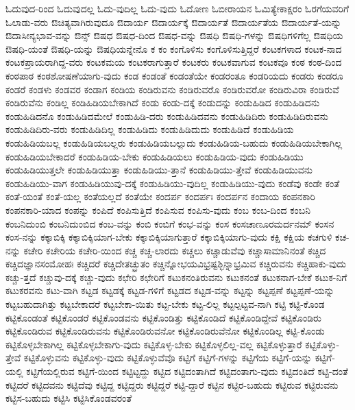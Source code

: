 {ಓದುವುದ-ರಿಂದ
ಓದುವುದಲ್ಲ
ಓದು-ವುದಿಲ್ಲ
ಓದು-ವುದು
ಓದೋಣ
ಓಬೀರಾಯನ
ಓಮಿತ್ಯೇಕಾಕ್ಷರಂ
ಓರಗೆಯವರಿಗೆ
ಓಲಾಡು-ವರು
ಔಚಿತ್ಯವಾಗಿರುವುದೂ
ಔದಾರ್ಯ
ಔದಾರ್ಯಕ್ಕೆ
ಔದಾರ್ಯತೆ
ಔದಾರ್ಯತೆಯ
ಔದಾರ್ಯತೆ-ಯನ್ನು
ಔದಾಸೀನ್ಯಭಾವ-ವನ್ನು
ಔನ್ಸ್
ಔಷಧ
ಔಷಧ-ದಿಂದ
ಔಷಧ-ವನ್ನು
ಔಷಧಿ
ಔಷಧಿ-ಗಳನ್ನು
ಔಷಧಿಗಳಿಗೆಲ್ಲ
ಔಷಧಿಯ
ಔಷಧಿ-ಯಂತೆ
ಔಷಧಿ-ಯನ್ನು
ಔಷಧಿಯನ್ನೇನೊ
ಕ
ಕಂ
ಕಂಗೊಳಿಸು
ಕಂಗೊಳಿಸುತ್ತಿದ್ದರೆ
ಕಂಟಕಗಳಾದ
ಕಂಟಕ-ನಾದ
ಕಂಟಕಪ್ರಾಯರಾಗಿದ್ದ-ವರು
ಕಂಟಕಮಯ
ಕಂಟಕರಾಗುತ್ತಾರೆ
ಕಂಟಕರು
ಕಂಟಕವಾಗುವ
ಕಂಟಕವೂ
ಕಂಠ
ಕಂಠ-ದಿಂದ
ಕಂಠಪಾಠ
ಕಂಠಶೋಷಣೆಯಾಗು-ವುದು
ಕಂಡ
ಕಂಡಂತೆ
ಕಂಡಂತೆಯೇ
ಕಂಡರಂತೂ
ಕಂಡರಿಯದು
ಕಂಡರು
ಕಂಡರೂ
ಕಂಡರೆ
ಕಂಡಳು
ಕಂಡವರ
ಕಂಡಾಗ
ಕಂಡಿಯ
ಕಂಡಿರುವನು
ಕಂಡಿರುವರೊ
ಕಂಡಿರುವರೋ
ಕಂಡಿರುವಿರಾ
ಕಂಡಿರುವೆ
ಕಂಡಿರುವೆನು
ಕಂಡಿಲ್ಲ
ಕಂಡಿಹಿಡಿಯಬೇಕಾಗಿದೆ
ಕಂಡು
ಕಂಡು-ದಕ್ಕೆ
ಕಂಡುದನ್ನು
ಕಂಡುಹಿಡಿದ
ಕಂಡುಹಿಡಿದನು
ಕಂಡುಹಿಡಿದನೊ
ಕಂಡುಹಿಡಿದಮೇಲೆ
ಕಂಡುಹಿಡಿ-ದರು
ಕಂಡುಹಿಡಿದವನು
ಕಂಡುಹಿಡಿದಿರು
ಕಂಡುಹಿಡಿದಿರುವನು
ಕಂಡುಹಿಡಿದಿರು-ವರು
ಕಂಡುಹಿಡಿದಿಲ್ಲ
ಕಂಡುಹಿಡಿದು
ಕಂಡುಹಿಡಿದುದು
ಕಂಡುಹಿಡಿದೆ
ಕಂಡುಹಿಡಿಯ
ಕಂಡುಹಿಡಿಯಬಲ್ಲ
ಕಂಡುಹಿಡಿಯಬಲ್ಲರು
ಕಂಡುಹಿಡಿಯಬಲ್ಲುದು
ಕಂಡುಹಿಡಿಯ-ಬಹುದು
ಕಂಡುಹಿಡಿಯಬೇಕಾಗಿಲ್ಲ
ಕಂಡುಹಿಡಿಯಬೇಕಾದರೆ
ಕಂಡುಹಿಡಿಯ-ಬೇಕು
ಕಂಡುಹಿಡಿಯಲು
ಕಂಡುಹಿಡಿಯ-ವುದು
ಕಂಡುಹಿಡಿಯು
ಕಂಡುಹಿಡಿಯುತ್ತಲೇ
ಕಂಡುಹಿಡಿಯುತ್ತಾ
ಕಂಡುಹಿಡಿಯು-ತ್ತಾನೆ
ಕಂಡುಹಿಡಿಯು-ತ್ತೇವೆ
ಕಂಡುಹಿಡಿಯುವನು
ಕಂಡುಹಿಡಿಯು-ವಾಗ
ಕಂಡುಹಿಡಿಯುವು-ದಕ್ಕೆ
ಕಂಡುಹಿಡಿಯು-ವುದಿಲ್ಲ
ಕಂಡುಹಿಡಿಯು-ವುದು
ಕಂಡೆವು
ಕಂಡೇ
ಕಂತೆ
ಕಂತೆ-ಯಂತೆ
ಕಂತೆ-ಯಲ್ಲ
ಕಂತೆಯಲ್ಲದೆ
ಕಂತೆಯೇ
ಕಂದರ್ಪ
ಕಂದರ್ಪಃ
ಕಂದರ್ಪನ
ಕಂದಾಯ
ಕಂಪನಕಾರಿ
ಕಂಪನಕಾರಿ-ಯಾದ
ಕಂಪನ್ನು
ಕಂಪಿದೆ
ಕಂಪಿಸುತ್ತಿದೆ
ಕಂಪಿಸುವ
ಕಂಪಿಸು-ವುದು
ಕಂಬ
ಕಂಬ-ದಿಂದ
ಕಂಬನಿ
ಕಂಬನಿದುಂಬಿ
ಕಂಬನಿದುಂಬಿದ
ಕಂಬ-ವನ್ನು
ಕಂಬಿ
ಕಂಬಿಗೆ
ಕಂಭ-ವನ್ನು
ಕಂಸ
ಕಂಸಚಾಣೂರಮರ್ದನಮ್
ಕಂಸನ
ಕಂಸ-ನನ್ನು
ಕಕ್ಕಾಬಿಕ್ಕಿ
ಕಕ್ಕಾಬಿಕ್ಕಿಯಾಗ-ಬೇಕು
ಕಕ್ಕಾಬಿಕ್ಕಿಯಾಗುತ್ತಾರೆ
ಕಕ್ಕಾಬಿಕ್ಕಿಯಾಗು-ವುದು
ಕಕ್ಷಿ
ಕಕ್ಷಿಯ
ಕಚಗುಳಿ
ಕಚ-ನನ್ನು
ಕಚೇರಿ
ಕಚೇರಿಯ
ಕಚೇರಿ-ಯಿಂದ
ಕಚ್ಚ
ಕಚ್ಚ-ಲಾರದು
ಕಚ್ಚಲು
ಕಚ್ಚಾಡುವೆವು
ಕಚ್ಚಾಸಾಮಾನಿನಂತೆ
ಕಚ್ಚಿದ
ಕಚ್ಚಿದಜ್ಞಾನಸಂಮೋಹಃ
ಕಚ್ಚಿದರೆ
ಕಚ್ಚಿದೇತಚ್ಛ್ರುತಂ
ಕಚ್ಚಿನ್ನೋಭಯವಿಭ್ರಷ್ಟಶ್ಛಿನ್ನಾಭ್ರಮಿವ
ಕಚ್ಚಿರುವನು
ಕಚ್ಚಿಹಾಕು-ವುದು
ಕಚ್ಚು-ತ್ತದೆ
ಕಚ್ಚುವು-ದಕ್ಕೆ
ಕಚ್ಚು-ವುದು
ಕಛೇರಿ
ಕಛೇರಿಗೆ
ಕಟುಕನಂತಿರುವನು
ಕಟುಕನಂತೆ
ಕಟುಕನಾಗ-ಬೇಕೆ
ಕಟುಕ-ನಿಗೆ
ಕಟುಕರವನು
ಕಟು-ವಾಗಿ
ಕಟ್ಟಡ
ಕಟ್ಟಡಕ್ಕೆ
ಕಟ್ಟಡ-ಗಳಿಗೆ
ಕಟ್ಟಡದ
ಕಟ್ಟಡ-ವನ್ನು
ಕಟ್ಟನ್ನು
ಕಟ್ಟಪ್ಪಣೆ
ಕಟ್ಟಪ್ಪಣೆ-ಯನ್ನು
ಕಟ್ಟಬಹುದಾಗಿತ್ತು
ಕಟ್ಟಬೇಕಾದರೆ
ಕಟ್ಟಬೇಕಾ-ಯಿತು
ಕಟ್ಟ-ಬೇಕು
ಕಟ್ಟ-ಲಿಲ್ಲ
ಕಟ್ಟಲ್ಪಟ್ಟವ-ನಾಗಿ
ಕಟ್ಟಿ
ಕಟ್ಟಿ-ಕೊಂಡ
ಕಟ್ಟಿಕೊಂಡಂತೆ
ಕಟ್ಟಿಕೊಂಡರೆ
ಕಟ್ಟಿಕೊಂಡವನು
ಕಟ್ಟಿಕೊಂಡಿತ್ತು
ಕಟ್ಟಿಕೊಂಡಿದೆ
ಕಟ್ಟಿಕೊಂಡಿದ್ದೇವೆ
ಕಟ್ಟಿಕೊಂಡಿರು
ಕಟ್ಟಿಕೊಂಡಿರುವ
ಕಟ್ಟಿಕೊಂಡಿರುವನು
ಕಟ್ಟಿಕೊಂಡಿರುವನೋ
ಕಟ್ಟಿಕೊಂಡಿರುವೆನೋ
ಕಟ್ಟಿಕೊಂಡಿಲ್ಲ
ಕಟ್ಟಿ-ಕೊಂಡು
ಕಟ್ಟಿಕೊಳ್ಳಬೇಕಾಗಿಲ್ಲ
ಕಟ್ಟಿಕೊಳ್ಳಬೇಕಾಗು-ವುದು
ಕಟ್ಟಿಕೊಳ್ಳ-ಬೇಕು
ಕಟ್ಟಿಕೊಳ್ಳಲಿಲ್ಲ-ವಲ್ಲ
ಕಟ್ಟಿಕೊಳ್ಳುತ್ತಾರೆ
ಕಟ್ಟಿಕೊಳ್ಳು-ತ್ತೇವೆ
ಕಟ್ಟಿಕೊಳ್ಳುವನು
ಕಟ್ಟಿಕೊಳ್ಳು-ವುದು
ಕಟ್ಟಿಕೊಳ್ಳುವೆವೊ
ಕಟ್ಟಿಗೆ
ಕಟ್ಟಿಗೆ-ಗಳನ್ನು
ಕಟ್ಟಿಗೆಯ
ಕಟ್ಟಿಗೆ-ಯನ್ನು
ಕಟ್ಟಿಗೆ-ಯಲ್ಲಿ
ಕಟ್ಟಿಗೆಯಲ್ಲಿರುವ
ಕಟ್ಟಿಗೆ-ಯಿಂದ
ಕಟ್ಟಿಟ್ಟದ್ದು
ಕಟ್ಟಿದ
ಕಟ್ಟಿದಂತಾಗಿದೆ
ಕಟ್ಟಿದಂತಾಗು-ವುದು
ಕಟ್ಟಿದಂತಿದೆ
ಕಟ್ಟಿ-ದಂತೆ
ಕಟ್ಟಿದರೆ
ಕಟ್ಟಿದವನು
ಕಟ್ಟಿದೆವು
ಕಟ್ಟಿದ್ದ
ಕಟ್ಟಿದ್ದರು
ಕಟ್ಟಿದ್ದರೆ
ಕಟ್ಟಿ-ದ್ದಾರೆ
ಕಟ್ಟಿನ
ಕಟ್ಟಿರ-ಬಹುದು
ಕಟ್ಟಿರುವ
ಕಟ್ಟಿರುವನು
ಕಟ್ಟಿಸ-ಬಹುದು
ಕಟ್ಟಿಸಿ
ಕಟ್ಟಿಸಿಕೊಂಡವರಂತೆ
}
